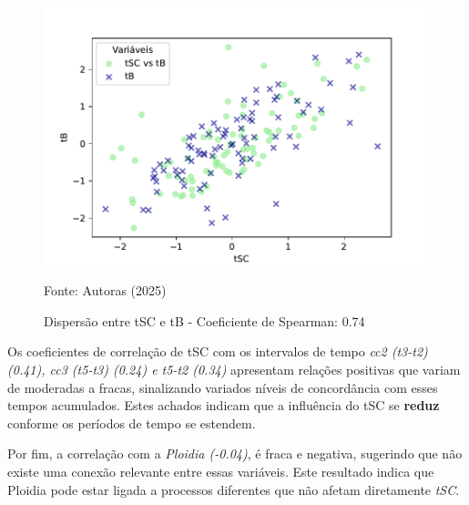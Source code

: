 \begin{figure}[h]
\begin{minipage}[b]{0.45\linewidth}
        \includegraphics[scale=0.35]{figuras/Spearman/tSC-tB.pdf}
        \caption{Dispersão entre tSC e tB - Coeficiente de Spearman: 0.74}
        \vspace{0.3cm}
        \begin{minipage}{\linewidth}
            \centering
            \scriptsize{Fonte: Autoras (2025)}
        \end{minipage}
    \end{minipage}
\end{figure}
\FloatBarrier

Os coeficientes de correlação de tSC com os intervalos de tempo \textit{cc2 (t3-t2) (0.41), cc3 (t5-t3) (0.24) e t5-t2 (0.34)} apresentam relações positivas que variam de moderadas a fracas, sinalizando variados níveis de concordância com esses tempos acumulados. Estes achados indicam que a influência do tSC se \textbf{reduz} conforme os períodos de tempo se estendem.

Por fim, a correlação com a \textit{Ploidia (-0.04)}, é fraca e negativa, sugerindo que não existe uma conexão relevante entre essas variáveis. Este resultado indica que Ploidia pode estar ligada a processos diferentes que não afetam diretamente \textit{tSC}.

